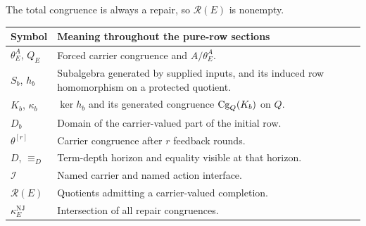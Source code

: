 The total congruence is always a repair, so $\mathcal R(E)$ is nonempty.


\begin{center}
\begin{tabularx}{\textwidth}{@{}lX@{}}
\toprule
Symbol & Meaning throughout the pure-row sections \\
\midrule
$\theta_E^A$, $Q_E$ & Forced carrier congruence and $A/\theta_E^A$. \\
$S_b$, $h_b$ & Subalgebra generated by supplied inputs, and its induced row homomorphism on a protected quotient. \\
$K_b$, $\kappa_b$ & $\ker h_b$ and its generated congruence $\operatorname{Cg}_Q(K_b)$ on $Q$. \\
$D_b$ & Domain of the carrier-valued part of the initial row. \\
$\theta^{[r]}$ & Carrier congruence after $r$ feedback rounds. \\
$D$, $\equiv_D$ & Term-depth horizon and equality visible at that horizon. \\
$\mathcal I$ & Named carrier and named action interface. \\
$\mathcal R(E)$ & Quotients admitting a carrier-valued completion. \\
$\kappa_E^{\mathrm{NJ}}$ & Intersection of all repair congruences. \\
\bottomrule
\end{tabularx}
\end{center}
